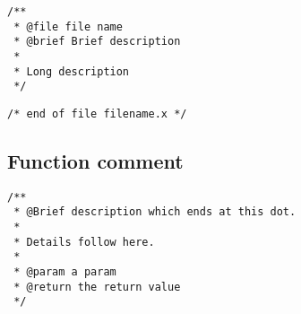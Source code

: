\begin{verbatim}
/**
 * @file file name
 * @brief Brief description
 *
 * Long description
 */
\end{verbatim}

\begin{verbatim}
/* end of file filename.x */
\end{verbatim}

\subsection{Function comment}

\begin{verbatim}
/**
 * @Brief description which ends at this dot.
 *
 * Details follow here.
 *
 * @param a param
 * @return the return value
 */
\end{verbatim}

